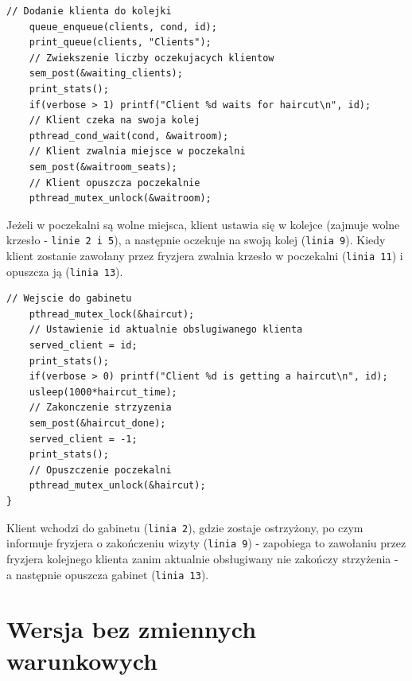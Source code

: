 \documentclass[12pt,a4paper]{article}
\begin{document}
	\begin{center}
		\begin{minipage}{0.8\linewidth}
\begin{lstlisting}[caption = Funkcja klienta 2/3.]
// Dodanie klienta do kolejki
    queue_enqueue(clients, cond, id);
    print_queue(clients, "Clients");
    // Zwiekszenie liczby oczekujacych klientow
    sem_post(&waiting_clients);
    print_stats();
    if(verbose > 1) printf("Client %d waits for haircut\n", id);
    // Klient czeka na swoja kolej
    pthread_cond_wait(cond, &waitroom);
    // Klient zwalnia miejsce w poczekalni
    sem_post(&waitroom_seats);
    // Klient opuszcza poczekalnie
    pthread_mutex_unlock(&waitroom);
\end{lstlisting}
		\end{minipage}
	\end{center}
	
	Jeżeli w poczekalni są wolne miejsca, klient ustawia się w kolejce
	(zajmuje wolne krzesło - \texttt{linie 2 i 5}), a następnie oczekuje
	na swoją kolej (\texttt{linia 9}). Kiedy klient zostanie zawołany
	przez fryzjera zwalnia krzesło w poczekalni (\texttt{linia 11}) i
	opuszcza ją (\texttt{linia 13}).
	
	\begin{center}
		\begin{minipage}{0.8\linewidth}
\begin{lstlisting}[caption = Funkcja klienta 3/3.]
// Wejscie do gabinetu
    pthread_mutex_lock(&haircut);
    // Ustawienie id aktualnie obslugiwanego klienta
    served_client = id;
    print_stats();
    if(verbose > 0) printf("Client %d is getting a haircut\n", id);
    usleep(1000*haircut_time);
    // Zakonczenie strzyzenia
    sem_post(&haircut_done);
    served_client = -1;
    print_stats();
    // Opuszczenie poczekalni
    pthread_mutex_unlock(&haircut);
}
\end{lstlisting}
		\end{minipage}
	\end{center}
	
	Klient wchodzi do gabinetu (\texttt{linia 2}), gdzie zostaje
	ostrzyżony, po czym informuje fryzjera o zakończeniu wizyty
	(\texttt{linia 9}) - zapobiega to zawołaniu przez fryzjera kolejnego
	klienta zanim aktualnie obsługiwany nie zakończy strzyżenia - a 
	następnie opuszcza gabinet (\texttt{linia 13}).
	
		\section{Wersja bez zmiennych warunkowych}
\end{document}
